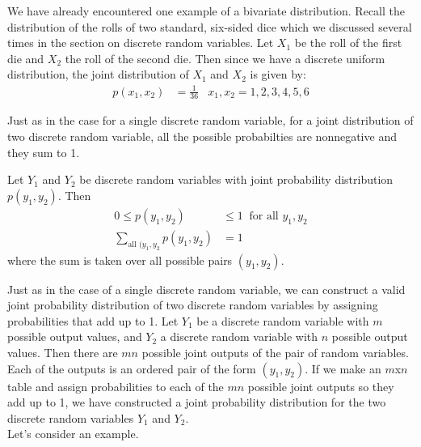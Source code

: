 \documentclass[12pt]{article}
\theoremstyle{definition}
\theoremstyle{remark}
\begin{document}
We have already encountered one example of a bivariate distribution. Recall the distribution of the rolls of two standard, six-sided dice which we discussed several times in the section on discrete random variables. Let $X_1$ be the roll of the first die and $X_2$ the roll of the second die. Then since we have a discrete uniform distribution, the joint distribution of $X_1$ and $X_2$ is given by:
\begin{align*}
p(x_1, x_2) &= \frac{1}{36} & x_1, x_2 = 1, 2, 3, 4, 5, 6
\end{align*}

Just as in the case for a single discrete random variable, for a joint distribution of two discrete random variable, all the possible probabilties are nonnegative and they sum to 1.

\begin{framed}
Let $Y_1$ and $Y_2$ be discrete random variables with joint probability distribution $p(y_1, y_2)$. Then
\begin{align*}
0 \leq p(y_1, y_2) &\leq 1 \:\text{ for all }y_1, y_2 \\
\sum_{\text{all } (y_1, y_2} p(y_1, y_2) &= 1
\end{align*}
where the sum is taken over all possible pairs $(y_1, y_2)$.
\end{framed}

Just as in the case of a single discrete random variable, we can construct a valid joint probability distribution of two discrete random variables by assigning probabilities that add up to 1. Let $Y_1$ be a discrete random variable with $m$ possible output values, and $Y_2$ a discrete random variable with $n$ possible output values. Then there are $mn$ possible joint outputs of the pair of random variables. Each of the outputs is an ordered pair of the form $(y_1, y_2)$. If we make an $m$x$n$ table and assign probabilities to each of the $mn$ possible joint outputs so they add up to 1, we have constructed a joint probability distribution for the two discrete random variables $Y_1$ and $Y_2$.\\

Let's consider an example.
\end{document}
